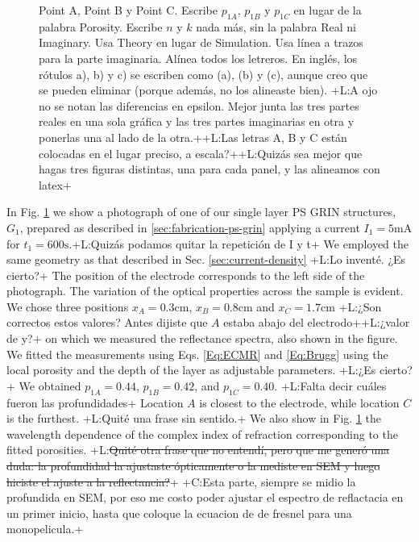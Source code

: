 \documentclass{article}
\newcommand{\notaL}[1]{{\color{blue}+L:#1+}}
\newcommand{\notaC}[1]{{\color{green}+C:#1+}}
\begin{document}
\begin{figure}
{{      Point A, Point B y Point C. Escribe $p_{1A}$, $p_{1B}$ y $p_{1C}$ en lugar
      de la palabra Porosity. Escribe $n$ y $k$ nada más, sin la
      palabra Real ni Imaginary. Usa Theory en lugar de
      Simulation. Usa línea a trazos para la parte
      imaginaria. Alínea todos los letreros. En inglés, los rótulos
      a), b) y c) se escriben como (a), (b) y (c), aunque creo que se
      pueden eliminar (porque además, no los alineaste bien). }
  \notaL{A ojo no se notan las diferencias en epsilon. Mejor junta las
  tres partes reales en una sola gráfica y las tres partes imaginarias
en otra y ponerlas una al lado de la otra.}\notaL{Las letras A, B y C
están colocadas en el lugar preciso, a escala?}\notaL{Quizás sea mejor
que hagas tres figuras distintas, una para cada panel, y las alineamos
con latex}}
  \label{fig:DR3}
\end{figure}
 In Fig. \ref{fig:DR3} we show a photograph of one of our single layer PS GRIN
 structures, $G_1$, prepared as described in
 \ref{sec:fabrication-ps-grin} applying a current $I_1=5\text{mA}$ for
 $t_1=600\text{s}$.\notaL{Quizás podamos quitar la repetición de I y
   t} We employed the same geometry as that described in
 Sec. \ref{sec:current-density} \notaL{Lo inventé. ¿Es cierto?}
The position of the electrode corresponds to the left side of the
photograph. The variation of the optical properties across the
sample is evident. We chose three positions $x_A=0.3\text{cm}$,
$x_B=0.8\text{cm}$ and $x_C=1.7\text{cm}$ \notaL{¿Son correctos estos
  valores? Antes dijiste que $A$ estaba abajo del electrodo}\notaL{¿valor de y?} on
which we measured the reflectance spectra, also shown in the figure.
We fitted the measurements using Eqs. \eqref{Eq:ECMR} and
\eqref{Eq:Brugg} using the local porosity and the depth of the layer
as adjustable parameters. \notaL{¿Es cierto?} We obtained $p_{1A}=0.44$, $p_{1B}=0.42$, and
$p_{1C}= 0.40$. \notaL{Falta decir cuáles fueron las profundidades}
Location $A$ is
closest to the electrode, while location $C$ is the furthest.
\notaL{Quité una frase sin sentido.}
We also show in Fig. \ref{fig:DR3} the wavelength dependence of
 the complex index of refraction corresponding to the fitted porosities.
\notaL{\sout{Quité otra frase que no entendí, pero que me generó una duda:
  la profundidad la ajustaste ópticamente o la mediste en SEM y luego
  hiciste el ajuste a la reflectancia?}} \notaC{Esta parte, siempre se midio la
  profundida en SEM, por eso me costo poder ajustar el espectro de reflactacia
  en un primer inicio, hasta que coloque la ecuacion de de fresnel
  para una monopelicula.}
\end{document}
